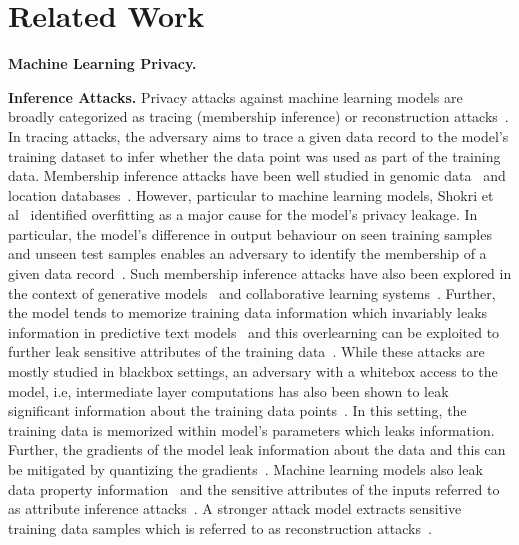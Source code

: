 \section{Related Work}\label{related}


\noindent\textbf{Machine Learning Privacy.}

\noindent\textbf{Inference Attacks.} Privacy attacks against machine learning models are broadly categorized as tracing (membership inference) or reconstruction attacks~\cite{1190751}.
In tracing attacks, the adversary aims to trace a given data record to the model's training dataset to infer whether the data point was used as part of the training data.
Membership inference attacks have been well studied in genomic data~\cite{10.1145/2976749.2978355} and location databases~\cite{DBLP:conf/ndss/PyrgelisTC18}.
However, particular to machine learning models, Shokri et al~\cite{shokri2017membership} identified overfitting as a major cause for the model's privacy leakage.
In particular, the model's difference in output behaviour on seen training samples and unseen test samples enables an adversary to identify the membership of a given data record~\cite{salem2018ml,8429311}.
Such membership inference attacks have also been explored in the context of generative models~\cite{LOGANMembershipInferenceAttacksAgainstGenerativeModels} and collaborative learning systems~\cite{DBLP:journals/corr/abs-1812-00910,melis2019exploiting}.
Further, the model tends to memorize training data information which invariably leaks information in predictive text models~\cite{236216,10.1145/3133956.3134077} and this overlearning can be exploited to further leak sensitive attributes of the training data~\cite{Song2020Overlearning}.
While these attacks are mostly studied in blackbox settings, an adversary with a whitebox access to the model, i.e, intermediate layer computations has also been shown to leak significant information about the training data points~\cite{leino2019stolen,DBLP:journals/corr/abs-1812-00910}.
In this setting, the training data is memorized within model's parameters which leaks information.
Further, the gradients of the model leak information about the data and this can be mitigated by quantizing the gradients~\cite{DBLP:journals/corr/abs-1906-08935}.
Machine learning models also leak data property information~\cite{Ganju:2018:PIA:3243734.3243834} and the sensitive attributes of the inputs referred to as attribute inference attacks~\cite{Fredrikson:2015:MIA:2810103.2813677,Hitaj:2017:DMU:3133956.3134012,Ateniese:2015:HSM:2829869.2829870}.
A stronger attack model extracts sensitive training data samples which is referred to as reconstruction attacks~\cite{salem2019updates,shokri2019privacy}.
